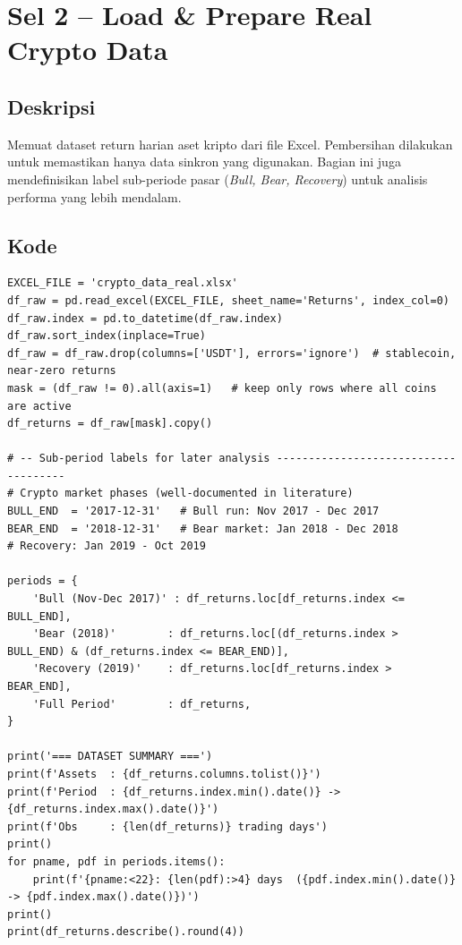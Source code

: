 \documentclass[12pt,a4paper]{article}
\begin{document}
\section{Sel 2 -- Load \& Prepare Real Crypto Data}

\subsection{Deskripsi}
Memuat dataset return harian aset kripto dari file Excel. Pembersihan dilakukan untuk memastikan 
hanya data sinkron yang digunakan. Bagian ini juga mendefinisikan label sub-periode pasar 
(\textit{Bull, Bear, Recovery}) untuk analisis performa yang lebih mendalam.

\subsection{Kode}
\begin{lstlisting}[caption={Load dan preparasi data lengkap}]
EXCEL_FILE = 'crypto_data_real.xlsx'
df_raw = pd.read_excel(EXCEL_FILE, sheet_name='Returns', index_col=0)
df_raw.index = pd.to_datetime(df_raw.index)
df_raw.sort_index(inplace=True)
df_raw = df_raw.drop(columns=['USDT'], errors='ignore')  # stablecoin, near-zero returns
mask = (df_raw != 0).all(axis=1)   # keep only rows where all coins are active
df_returns = df_raw[mask].copy()

# -- Sub-period labels for later analysis -------------------------------------
# Crypto market phases (well-documented in literature)
BULL_END  = '2017-12-31'   # Bull run: Nov 2017 - Dec 2017
BEAR_END  = '2018-12-31'   # Bear market: Jan 2018 - Dec 2018
# Recovery: Jan 2019 - Oct 2019

periods = {
    'Bull (Nov-Dec 2017)' : df_returns.loc[df_returns.index <= BULL_END],
    'Bear (2018)'        : df_returns.loc[(df_returns.index > BULL_END) & (df_returns.index <= BEAR_END)],
    'Recovery (2019)'    : df_returns.loc[df_returns.index > BEAR_END],
    'Full Period'        : df_returns,
}

print('=== DATASET SUMMARY ===')
print(f'Assets  : {df_returns.columns.tolist()}')
print(f'Period  : {df_returns.index.min().date()} -> {df_returns.index.max().date()}')
print(f'Obs     : {len(df_returns)} trading days')
print()
for pname, pdf in periods.items():
    print(f'{pname:<22}: {len(pdf):>4} days  ({pdf.index.min().date()} -> {pdf.index.max().date()})')
print()
print(df_returns.describe().round(4))
\end{lstlisting}
\end{document}
